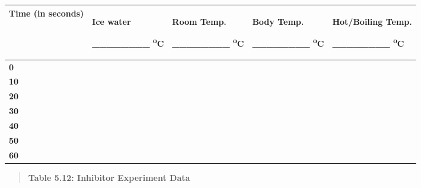 \documentclass[
  letterpaper,
  DIV=11,
  numbers=noendperiod]{scrreprt}
\newcounter{none} %
\begin{document}
{\def\LTcaptype{none} %
\begin{longtable}[]{@{}
  >{\centering\arraybackslash}p{}
  >{\centering\arraybackslash}p{}
  >{\centering\arraybackslash}p{}
  >{\centering\arraybackslash}p{}
  >{\centering\arraybackslash}p{}@{}}
\toprule\noalign{}
\begin{minipage}[b]{\linewidth}\centering
\textbf{Time (in seconds)}
\end{minipage} & \begin{minipage}[b]{\linewidth}\centering
\textbf{Ice water}

\textbf{\_\_\_\_\_\_\_\_ \textsuperscript{o}C}
\end{minipage} & \begin{minipage}[b]{\linewidth}\centering
\textbf{Room Temp.}

\textbf{\_\_\_\_\_\_\_\_ \textsuperscript{o}C}
\end{minipage} & \begin{minipage}[b]{\linewidth}\centering
\textbf{Body Temp.}

\textbf{\_\_\_\_\_\_\_\_ \textsuperscript{o}C}
\end{minipage} & \begin{minipage}[b]{\linewidth}\centering
\textbf{Hot/Boiling Temp.}

\textbf{\_\_\_\_\_\_\_\_ \textsuperscript{o}C}
\end{minipage} \\
\midrule\noalign{}
\endhead
\bottomrule\noalign{}
\endlastfoot
\textbf{0} & & & & \\
\textbf{10} & & & & \\
\textbf{20} & & & & \\
\textbf{30} & & & & \\
\textbf{40} & & & & \\
\textbf{50} & & & & \\
\textbf{60} & & & & \\
\end{longtable}
}

\begin{quote}
\textbf{Table 5.12: Inhibitor Experiment Data}
\end{quote}
\end{document}
